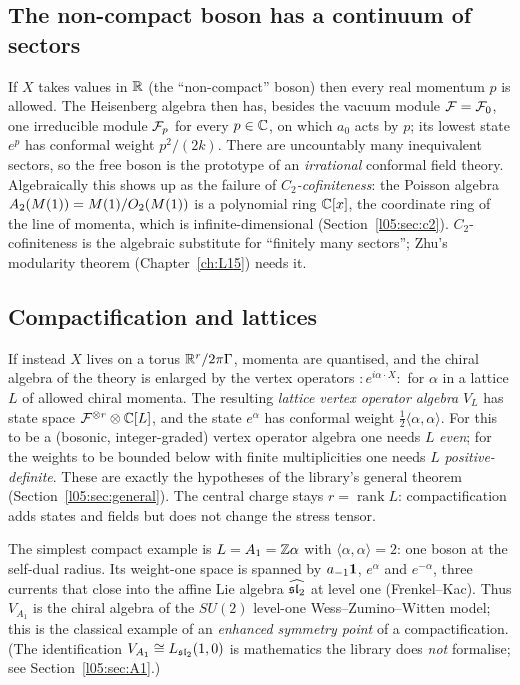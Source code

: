 \subsection{The non-compact boson has a continuum of sectors}

If $X$ takes values in $\mathbb{R}$ (the ``non-compact'' boson) then every real momentum $p$ is allowed.
The Heisenberg algebra then has, besides the vacuum module $\mathcal{F}=\mathcal{F}_0$, one irreducible
module $\mathcal{F}_p$ for every $p\in{\mathbb{C}}$, on which $a_0$ acts by $p$; its lowest state $e^{p}$ has
conformal weight $p^2/(2k)$. There are uncountably many inequivalent sectors, so the free boson is the
prototype of an \emph{irrational} conformal field theory. Algebraically this shows up as the failure
of \emph{$C_2$-cofiniteness}: the Poisson algebra $A_2(M(1))=M(1)/O_2(M(1))$ is a polynomial
ring ${\mathbb{C}}[x]$, the coordinate ring of the line of momenta, which is infinite-dimensional
(Section~\ref{l05:sec:c2}). $C_2$-cofiniteness is the algebraic substitute for ``finitely many
sectors''; Zhu's modularity theorem (Chapter~\ref{ch:L15}) needs it.

\subsection{Compactification and lattices}

If instead $X$ lives on a torus $\mathbb{R}^r/2\pi\Gamma$, momenta are quantised, and the chiral algebra of
the theory is enlarged by the vertex operators ${:}e^{i\alpha\cdot X}{:}$ for $\alpha$ in a lattice $L$
of allowed chiral momenta. The resulting \emph{lattice vertex operator algebra} $V_L$ has state space
$\mathcal{F}^{\otimes r}\otimes{\mathbb{C}}[L]$, and the state $e^\alpha$ has conformal weight
$\frac12\langle\alpha,\alpha\rangle$. For this to be a (bosonic, integer-graded) vertex operator
algebra one needs $L$ \emph{even}; for the weights to be bounded below with finite multiplicities one
needs $L$ \emph{positive-definite}. These are exactly the hypotheses of the library's general theorem
(Section~\ref{l05:sec:general}). The central charge stays $r=\operatorname{rank}L$: compactification
adds states and fields but does not change the stress tensor.

The simplest compact example is $L=A_1={\mathbb{Z}}\alpha$ with $\langle\alpha,\alpha\rangle=2$: one boson at
the self-dual radius. Its weight-one space is spanned by $a_{-1}\mathbf{1}$, $e^{\alpha}$ and $e^{-\alpha}$, three
currents that close into the affine Lie algebra $\widehat{\mathfrak{sl}_2}$ at level one (Frenkel--Kac). Thus
$V_{A_1}$ is the chiral algebra of the $SU(2)$ level-one Wess--Zumino--Witten model; this is the
classical example of an \emph{enhanced symmetry point} of a compactification. (The identification
$V_{A_1}\cong L_{\mathfrak{sl}_2}(1,0)$ is mathematics the library does \emph{not} formalise; see
Section~\ref{l05:sec:A1}.)

